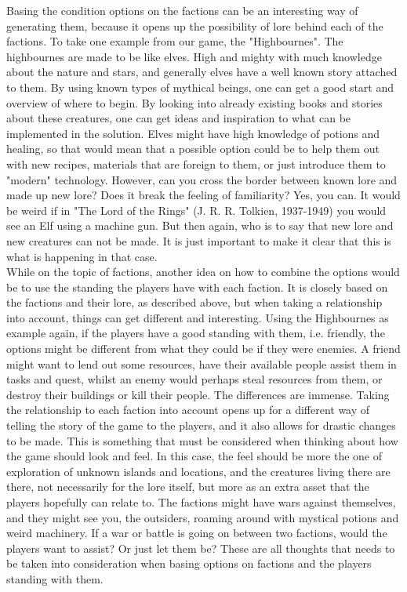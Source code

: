 Basing the condition options on the factions can be an interesting way of generating them, because it opens up the possibility of lore behind each of the factions. To take one example from our game, the "Highbournes". The highbournes are made to be like elves. High and mighty with much knowledge about the nature and stars, and generally elves have a well known story attached to them. By using known types of mythical beings, one can get a good start and overview of where to begin. By looking into already existing books and stories about these creatures, one can get ideas and inspiration to what can be implemented in the solution. Elves might have high knowledge of potions and healing, so that would mean that a possible option could be to help them out with new recipes, materials that are foreign to them, or just introduce them to "modern" technology.
However, can you cross the border between known lore and made up new lore? Does it break the feeling of familiarity?
Yes, you can. It would be weird if in "The Lord of the Rings" (J. R. R. Tolkien, 1937-1949) you would see an Elf using a machine gun.
But then again, who is to say that new lore and new creatures can not be made. It is just important to make it clear that this is what is happening in that case.\\

While on the topic of factions, another idea on how to combine the options would be to use the standing the players have with each faction. It is closely based on the factions and their lore, as described above, but when taking a relationship into account, things can get different and interesting. Using the Highbournes as example again, if the players have a good standing with them, i.e. friendly, the options might be different from what they could be if they were enemies. A friend might want to lend out some resources, have their available people assist them in tasks and quest, whilst an enemy would perhaps steal resources from them, or destroy their buildings or kill their people. The differences are immense. Taking the relationship to each faction into account opens up for a different way of telling the story of the game to the players, and it also allows for drastic changes to be made. This is something that must be considered when thinking about how the game should look and feel. In this case, the feel should be more the one of exploration of unknown islands and locations, and the creatures living there are there, not necessarily for the lore itself, but more as an extra asset that the players hopefully can relate to. The factions might have wars against themselves, and they might see you, the outsiders, roaming around with mystical potions and weird machinery. If a war or battle is going on between two factions, would the players want to assist? Or just let them be? These are all thoughts that needs to be taken into consideration when basing options on factions and the players standing with them.\\


